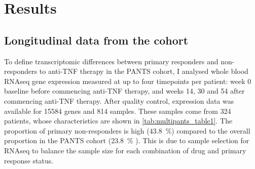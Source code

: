 

\section{Results}

\subsection{Longitudinal  data from the  cohort}

To define transcriptomic differences between primary responders and non-responders to anti-\gls{TNF} therapy in the \gls{PANTS} cohort, 
I analysed whole blood \gls{RNAseq} gene expression measured at up to four timepoints per patient:
week 0 baseline before commencing anti-\gls{TNF} therapy, and weeks 14, 30 and 54 after commencing anti-\gls{TNF} therapy.
After quality control, expression data was available for \num{15584} genes and 814 samples.
These samples come from 324 patients, whose characteristics are shown in \cref{tab:multipants_table1}.
The proportion of primary non-responders is high (\SI[round-precision=1]{43.8}{\percent}) compared to the overall proportion in the \gls{PANTS} cohort (\SI[round-precision=1]{23.8}{\percent} \autocite{kennedy2019PredictorsAntiTNFTreatment}).
This is due to sample selection for \gls{RNAseq} to balance the sample size for each combination of drug and primary response status.

